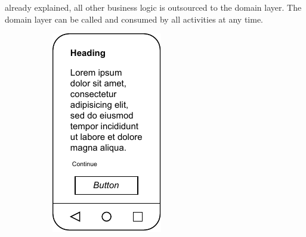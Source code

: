 already explained, all other business logic is outsourced to the domain layer. The domain layer can be called and consumed by all activities at any time.



\begin{figure}
    \centering
    \begin{subfigure}[b]{0.25\textwidth}
        \centering
        \includegraphics[width=\textwidth]{content/05_design_and_dev_artefacts/ActivityInfoScreen.drawio.pdf}

\end{subfigure}
\end{figure}
